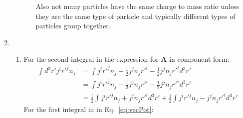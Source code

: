 \documentclass[12pt,a4]{article}
\begin{document}
\begin{enumerate}
\begin{enumerate}
\begin{enumerate}
            Also not many particles have the same charge to mass ratio unless they are the same type of particle and typically different types of particles group together.
        \end{enumerate}
    \end{enumerate}
  \item
    \begin{enumerate}
      \item
      For the second integral in the expression for $\mathbf{A}$ in component form:
      \begin{align}
        \int d^3r' j^i {r'}^j n_j &= \int j^i  {r'}^j n_j + \frac{1}{2}j^j n_j{r'}^i - \frac{1}{2}j^j n_j{r'}^i d^3r' \nonumber \\
                                   &= \int j^i  {r'}^j n_j + \frac{1}{2}j^j n_j{r'}^i - \frac{1}{2}j^j n_j{r'}^i d^3r' \nonumber\\
                                   &=\frac{1}{2} \int j^i  {r'}^j n_j + j^j n_j{r'}^id^3r' + \frac{1}{2}\int j^i  {r'}^j n_j - j^j n_j{r'}^i d^3r' \label{eq:vecPot}
      \end{align}
      For the first integral in in Eq.~\ref{eq:vecPot}:
      \begin{align*}

\end{align*}
\end{enumerate}
\end{enumerate}
\end{document}
